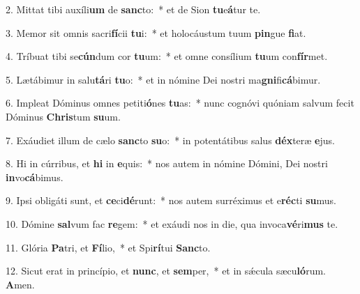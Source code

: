2. Mittat tibi auxíli\textbf{um} de \textbf{sanc}to:~*  et de Sion \textbf{tu}e\textbf{á}tur te.\

3. Memor sit omnis sacri\textbf{fí}cii \textbf{tu}i:~*  et holocáustum tuum \textbf{pin}gue \textbf{fi}at.\

4. Tríbuat tibi se\textbf{cún}dum cor \textbf{tu}um:~*  et omne consílium \textbf{tu}um con\textbf{fír}met.\

5. Lætábimur in salu\textbf{tá}ri \textbf{tu}o:~*  et in nómine Dei nostri ma\textbf{gni}fi\textbf{cá}bimur.\

6. Impleat Dóminus omnes petiti\textbf{ó}nes \textbf{tu}as:~*  nunc cognóvi quóniam salvum fecit Dóminus \textbf{Chris}tum \textbf{su}um.\

7. Exáudiet illum de cælo \textbf{sanc}to \textbf{su}o:~*  in potentátibus salus \textbf{déx}teræ \textbf{e}jus.\

8. Hi in cúrribus, et \textbf{hi} in \textbf{e}quis:~*  nos autem in nómine Dómini, Dei nostri \textbf{in}vo\textbf{cá}bimus.\

9. Ipsi obligáti sunt, et \textbf{ce}ci\textbf{dé}runt:~*  nos autem surréximus et e\textbf{réc}ti \textbf{su}mus.\

10. Dómine \textbf{sal}vum fac \textbf{re}gem:~*  et exáudi nos in die, qua invoca\textbf{vé}ri\textbf{mus} te.\

11. Glória \textbf{Pa}tri, et \textbf{Fí}lio,~*  et Spi\textbf{rí}tui \textbf{Sanc}to.\

12. Sicut erat in princípio, et \textbf{nunc}, et \textbf{sem}per,~*  et in sǽcula sæcu\textbf{ló}rum. \textbf{A}men.\

